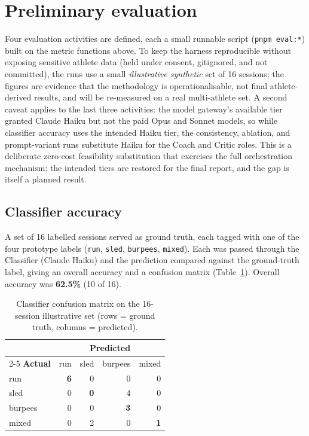 \section{Preliminary evaluation}

Four evaluation activities are defined, each a small runnable script (\texttt{pnpm eval:*}) built on the metric functions above. To keep the harness reproducible without exposing sensitive athlete data (held under consent, gitignored, and not committed), the runs use a small \emph{illustrative synthetic} set of 16 sessions; the figures are evidence that the methodology is operationalisable, not final athlete-derived results, and will be re-measured on a real multi-athlete set. A second caveat applies to the last three activities: the model gateway's available tier granted Claude Haiku but not the paid Opus and Sonnet models, so while classifier accuracy uses the intended Haiku tier, the consistency, ablation, and prompt-variant runs substitute Haiku for the Coach and Critic roles. This is a deliberate zero-cost feasibility substitution that exercises the full orchestration mechanism; the intended tiers are restored for the final report, and the gap is itself a planned result.

\subsection{Classifier accuracy}

A set of 16 labelled sessions served as ground truth, each tagged with one of the four prototype labels (\texttt{run}, \texttt{sled}, \texttt{burpees}, \texttt{mixed}). Each was passed through the Classifier (Claude Haiku) and the prediction compared against the ground-truth label, giving an overall accuracy and a confusion matrix (Table~\ref{tab:confusion}). Overall accuracy was \textbf{62.5\%} (10 of 16).

\begin{table}[H]
\centering
\caption{Classifier confusion matrix on the 16-session illustrative set (rows = ground truth, columns = predicted).}
\label{tab:confusion}
\begin{tabular}{lrrrr}
\toprule
 & \multicolumn{4}{c}{\textbf{Predicted}} \\
\cmidrule(l){2-5}
\textbf{Actual} & run & sled & burpees & mixed \\
\midrule
run     & \textbf{6} & 0 & 0 & 0 \\
sled    & 0 & \textbf{0} & 4 & 0 \\
burpees & 0 & 0 & \textbf{3} & 0 \\
mixed   & 0 & 2 & 0 & \textbf{1} \\
\bottomrule
\end{tabular}
\end{table}

